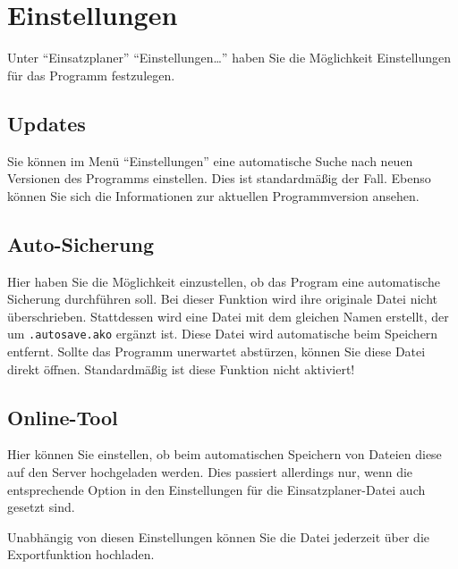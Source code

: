 \chapter{Einstellungen}
Unter ``Einsatzplaner'' \nach ``Einstellungen\dots'' haben Sie die Möglichkeit Einstellungen für das Programm festzulegen.

\section{Updates}
Sie können im Menü ``Einstellungen'' eine automatische Suche nach neuen Versionen des Programms einstellen.
Dies ist standardmäßig der Fall.
Ebenso können Sie sich die Informationen zur aktuellen Programmversion ansehen.


\section{Auto-Sicherung}
Hier haben Sie die Möglichkeit einzustellen, ob das Program eine automatische Sicherung durchführen soll.
Bei dieser Funktion wird ihre originale Datei nicht überschrieben.
Stattdessen wird eine Datei mit dem gleichen Namen erstellt, der um \texttt{.autosave.ako} ergänzt ist.
Diese Datei wird automatische beim Speichern entfernt.
Sollte das Programm unerwartet abstürzen, können Sie diese Datei direkt öffnen.
Standardmäßig ist diese Funktion nicht aktiviert!



\section{Online-Tool}
Hier können Sie einstellen, ob beim automatischen Speichern von Dateien diese auf den Server hochgeladen werden.
Dies passiert allerdings nur, wenn die entsprechende Option in den Einstellungen für die Einsatzplaner-Datei auch gesetzt sind.

Unabhängig von diesen Einstellungen können Sie die Datei jederzeit über die Exportfunktion hochladen.
